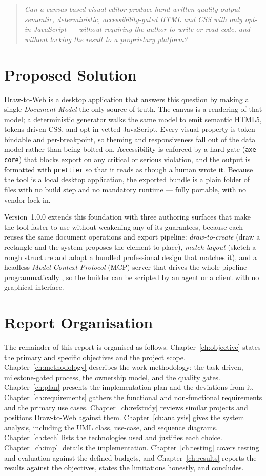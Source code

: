 \begin{quote}
\itshape Can a canvas-based visual editor produce hand-written-quality output ---
semantic, deterministic, accessibility-gated HTML and CSS with only opt-in
JavaScript --- without requiring the author to write or read code, and without
locking the result to a proprietary platform?
\end{quote}

\section{Proposed Solution}
Draw-to-Web is a desktop application that answers this question by making a single
\emph{Document Model} the only source of truth. The canvas is a rendering of that
model; a deterministic generator walks the same model to emit semantic HTML5,
tokens-driven CSS, and opt-in vetted JavaScript. Every visual property is
token-bindable and per-breakpoint, so theming and responsiveness fall out of the
data model rather than being bolted on. Accessibility is enforced by a hard gate
(\texttt{axe-core}) that blocks export on any critical or serious violation, and
the output is formatted with \texttt{prettier} so that it reads as though a human
wrote it. Because the tool is a local desktop application, the exported bundle is a
plain folder of files with no build step and no mandatory runtime --- fully
portable, with no vendor lock-in.

Version~1.0.0 extends this foundation with three authoring surfaces that make the
tool faster to use without weakening any of its guarantees, because each reuses the
same document operations and export pipeline: \emph{draw-to-create} (draw a
rectangle and the system proposes the element to place), \emph{match-layout}
(sketch a rough structure and adopt a bundled professional design that matches it),
and a headless \emph{Model Context Protocol} (MCP) server that drives the whole
pipeline programmatically \cite{mcp-spec}, so the builder can be scripted by an
agent or a client with no graphical interface.

\section{Report Organisation}
The remainder of this report is organised as follows. Chapter~\ref{ch:objective}
states the primary and specific objectives and the project scope.
Chapter~\ref{ch:methodology} describes the work methodology: the task-driven,
milestone-gated process, the ownership model, and the quality gates.
Chapter~\ref{ch:plan} presents the implementation plan and the deviations from it.
Chapter~\ref{ch:requirements} gathers the functional and non-functional
requirements and the primary use cases. Chapter~\ref{ch:refstudy} reviews similar
projects and positions Draw-to-Web against them. Chapter~\ref{ch:analysis} gives
the system analysis, including the UML class, use-case, and sequence diagrams.
Chapter~\ref{ch:tech} lists the technologies used and justifies each choice.
Chapter~\ref{ch:impl} details the implementation. Chapter~\ref{ch:testing} covers
testing and evaluation against the defined budgets, and Chapter~\ref{ch:results}
reports the results against the objectives, states the limitations honestly, and
concludes.
